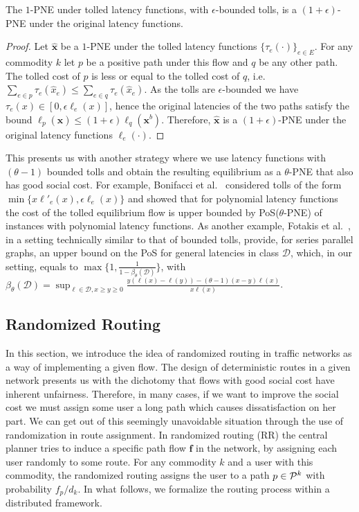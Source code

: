 \begin{lemma}
The $1$-PNE under tolled latency functions, with  $\epsilon$-bounded tolls, is a $(1+\epsilon)$-PNE under the original latency functions.
\end{lemma}
\begin{proof}
Let $\hat{\bm{x}}$  be a $1$-PNE under the tolled latency functions $\{\tau_e(\cdot)\}_{e\in E}$. For any commodity $k$ let $p$ be a positive path under this flow and $q$ be any other path. The tolled cost of $p$ is less or equal to the tolled cost of $q$, i.e. $\sum_{e\in p}\tau_e(\hat{x}_e)\leq \sum_{e\in q}\tau_e(\hat{x}_e)$. As the tolls are $\epsilon$-bounded we have $\tau_e(x)\in [0,\epsilon\ell_e(x)]$, hence the original latencies of the two paths satisfy the bound $\ell_p(\hat{\bm{x}}) \leq (1+\epsilon) \ell_q(\bm{x}^b)$. Therefore, $\hat{\bm{x}}$ is a $(1+\epsilon)$-PNE under the original latency functions $\ell_e(\cdot)$.
\end{proof}
    
This presents us with another strategy where we use latency functions with $(\theta-1)$ bounded tolls and obtain the resulting equilibrium as a $\theta$-PNE that also has good social cost. For example, %
Bonifacci et al.~\cite{bonifaci2011efficiency} considered tolls of the form $\min \{x\ell'_e(x), \epsilon \ell_e(x)\}$ and showed that for polynomial latency functions the cost of the tolled equilibrium flow is upper bounded by PoS($\theta$-PNE) of instances with polynomial latency functions. As another example, Fotakis et al.~\cite{fotakis2015improving}, in a setting technically similar  to that of bounded tolls,  provide, for series parallel graphs, an upper bound   on the PoS for general latencies in class $\mathcal{D}$, which, in our setting, equals to %
$\max\Big\{1,\frac{1}{1-\beta_\theta(\mathcal{D})}\Big\}$, with
$\beta_\theta(\mathcal{D})=\sup_{\ell\in \mathcal{D}, x\geq
y\geq0}\frac{y(\ell(x)-\ell(y))-(\theta-1)(x-y)\ell(x)}{x\ell(x)}$.   
 

\subsection{Randomized Routing}
In this section, we introduce the idea of randomized routing in traffic networks as a way of implementing a given flow.
The design of deterministic routes in a given network presents us with the dichotomy that flows with good social cost have inherent unfairness. Therefore, in many cases, if we want to improve the social cost we must assign some user a long path which causes dissatisfaction on her part. We can get out of this seemingly unavoidable situation through the use of randomization in route assignment.
In randomized routing (RR) the central planner tries to induce a specific path flow $\bm{f}$ in the network, by assigning each user randomly to some route. For any commodity $k$ and a user with this commodity, the randomized routing assigns the user to a path $p\in \mathcal{P}^k$ with probability $f_p/ d_k$. In what follows, we formalize the routing process within a distributed framework.
 
